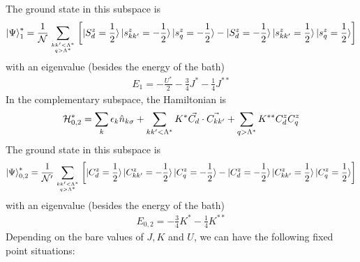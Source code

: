 \documentclass[12pt,twoside]{article}
\numberwithin{equation}{section}
\begin{document}
The ground state in this subspace is
\begin{equation}\begin{aligned}
	\ket{\Psi}^*_{1}= \frac{1}{\mathcal{N}}\sum_{kk^\prime < \Lambda^*\atop{q>\Lambda^*}}\left[\ket{S_d^z= \frac{1}{2}}\ket{s^z_{kk^\prime}= - \frac{1}{2}}\ket{s^z_{q}= - \frac{1}{2}} - \ket{S_d^z=- \frac{1}{2}}\ket{s^z_{kk^\prime}=  \frac{1}{2}}\ket{s^z_{q}=  \frac{1}{2}}\right]
\end{aligned}\end{equation}
with an eigenvalue (besides the energy of the bath)
\begin{equation}\begin{aligned}
	E_{1} = - \frac{U^*}{2} - \frac{3}{4}J^* - \frac{1}{4}J^{**}
\end{aligned}\end{equation}
In the complementary subspace, the Hamiltonian is
\begin{equation}\begin{aligned}
	\mathcal{H}^*_{0,2} = \sum_k \epsilon_k \hat n_{k\sigma} + \sum_{kk^\prime < \Lambda^*}K^* \vec{C_d}\cdot\vec{C_{kk^\prime}}+ \sum_{q > \Lambda^*}K^{**} C_d^z C^z_{q}
\end{aligned}\end{equation}
The ground state in this subspace is
\begin{equation}\begin{aligned}
	\ket{\Psi}^*_{0,2}= \frac{1}{\mathcal{N^\prime}}\sum_{kk^\prime < \Lambda^*\atop{q>\Lambda^*}}\left[\ket{C_d^z= \frac{1}{2}}\ket{C^z_{kk^\prime}= - \frac{1}{2}}\ket{C^z_{q}= - \frac{1}{2}} - \ket{C_d^z=- \frac{1}{2}}\ket{C^z_{kk^\prime}=  \frac{1}{2}}\ket{C^z_{q}=  \frac{1}{2}}\right]
\end{aligned}\end{equation}
with an eigenvalue (besides the energy of the bath)
\begin{equation}\begin{aligned}
	E_{0,2} = - \frac{3}{4}K^* - \frac{1}{4}K^{**}
\end{aligned}\end{equation}
Depending on the bare values of \(J,K\) and \(U\), we can have the following fixed point situations:
\end{document}
